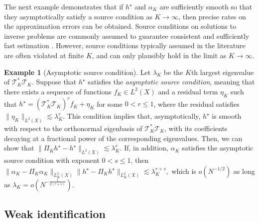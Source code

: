 \documentclass[11pt]{article}
\theoremstyle{plain}
\theoremstyle{definition}
\newtheorem{example}{Example}
\theoremstyle{remark}
\theoremstyle{definition}
\begin{document}
The next example demonstrates that if \( h^\star \) and \( \alpha_K \) are sufficiently smooth so that they asymptotically satisfy a source condition as \( K \to \infty \), then precise rates on the approximation errors can be obtained. Source conditions on solutions to inverse problems are commonly assumed to guarantee consistent and sufficiently fast estimation \citep{bennett2023source}. However, source conditions typically assumed in the literature are often violated at finite \( K \), and can only plausibly hold in the limit as \( K \to \infty \).



\begin{example}[Asymptotic source condition]
      Let $\lambda_K$ be the $K$th largest eigenvalue of $\mathcal{T}_K^*\mathcal{T}_K$. Suppose that $h^\star$ satisfies the \emph{asymptotic source condition}, meaning that there exists a sequence of functions $f_K \in L^2(X)$ and a residual term $\eta_K$ such that $h^\star = (\mathcal{T}_K^* \mathcal{T}_K)^r f_K + \eta_K$ for some $0 < r \leq 1$, where the residual satisfies $\|\eta_K\|_{L^2(X)} \lesssim \lambda_K^r$. This condition implies that, asymptotically, $h^\star$ is smooth with respect to the orthonormal eigenbasis of $\mathcal{T}_K^* \mathcal{T}_K$, with its coefficients decaying at a fractional power of the corresponding eigenvalues. Then, we can show that $\|\Pi_K h^\star - h^\star\|_{L^2(X)} \lesssim \lambda_K^r$. If, in addition, $\alpha_K$ satisfies the asymptotic source condition with exponent $0 < s \leq 1$, then  $\| \alpha_K - \Pi_{K} \alpha_K \|_{L^2_K(X)} \| h^\star  - \Pi_{K} h^\star\|_{L^2_K(X)} \lesssim \lambda_K^{r+s},$ which is $o(N^{-1/2})$ as long as $\lambda_K = o(N^{-\frac{1}{2(r+s)}}) $.
\end{example}
 

 \subsection{Weak identification}


\label{appendix::exampleweak}
\end{document}
